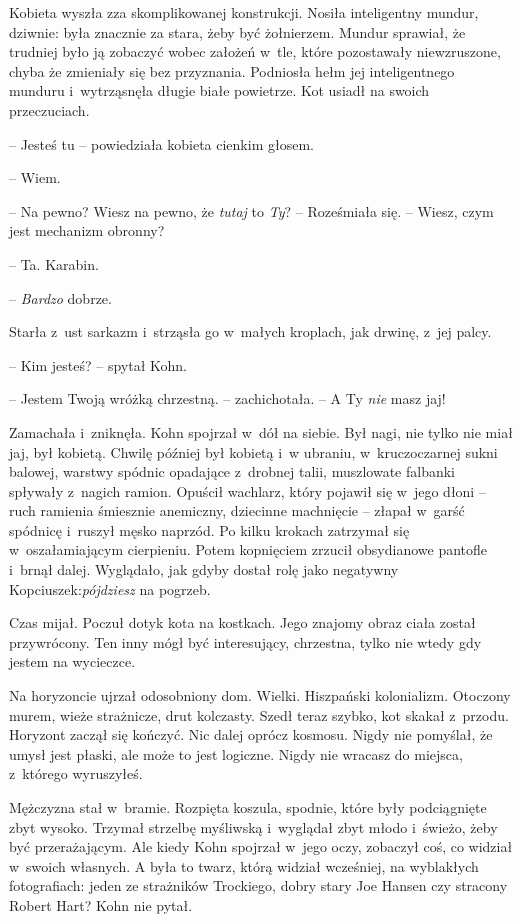 \documentclass[oneside,polish,11pt,sfheadings]{mwbk}
\begin{document}
Kobieta wyszła zza skomplikowanej konstrukcji. Nosiła inteligentny
mundur, dziwnie: była znacznie za stara, żeby być żołnierzem. Mundur
sprawiał, że trudniej było ją zobaczyć wobec założeń w~tle, które
pozostawały niewzruszone, chyba że zmieniały się bez przyznania.
Podniosła hełm jej inteligentnego munduru i~wytrząsnęła długie białe
powietrze. Kot usiadł na swoich przeczuciach.

-- Jesteś tu -- powiedziała kobieta cienkim głosem.

-- Wiem.

-- Na pewno? Wiesz na pewno, że \emph{tutaj} to \emph{Ty}? -- Roześmiała
się. -- Wiesz, czym jest mechanizm obronny?

-- Ta. Karabin.

-- \emph{Bardzo} dobrze.

Starła z~ust sarkazm i~strząsła go w~małych kroplach, jak drwinę, z~jej
palcy.

-- Kim jesteś? -- spytał Kohn.

-- Jestem Twoją wróżką chrzestną. -- zachichotała. -- A Ty \emph{nie} masz
jaj!

Zamachała i~zniknęła. Kohn spojrzał w~dół na siebie. Był nagi, nie tylko
nie miał jaj, był kobietą. Chwilę później był kobietą i~w ubraniu, w~kruczoczarnej sukni balowej, warstwy spódnic opadające z~drobnej talii,
muszlowate falbanki spływały z~nagich ramion. Opuścił wachlarz, który
pojawił się w~jego dłoni -- ruch ramienia śmiesznie anemiczny, dziecinne
machnięcie -- złapał w~garść spódnicę i~ruszył męsko naprzód. Po kilku
krokach zatrzymał się w~oszałamiającym cierpieniu. Potem kopnięciem
zrzucił obsydianowe pantofle i~brnął dalej. Wyglądało, jak gdyby dostał
rolę jako negatywny Kopciuszek:\emph{pójdziesz} na pogrzeb.

Czas mijał. Poczuł dotyk kota na kostkach. Jego znajomy obraz ciała
został przywrócony. Ten inny mógł być interesujący, chrzestna, tylko nie
wtedy gdy jestem na wycieczce.

Na horyzoncie ujrzał odosobniony dom. Wielki. Hiszpański kolonializm.
Otoczony murem, wieże strażnicze, drut kolczasty. Szedł teraz szybko,
kot skakał z~przodu. Horyzont zaczął się kończyć. Nic dalej oprócz
kosmosu. Nigdy nie pomyślał, że umysł jest płaski, ale może to jest
logiczne. Nigdy nie wracasz do miejsca, z~którego wyruszyłeś.

Mężczyzna stał w~bramie. Rozpięta koszula, spodnie, które były
podciągnięte zbyt wysoko. Trzymał strzelbę myśliwską i~wyglądał zbyt
młodo i~świeżo, żeby być przerażającym. Ale kiedy Kohn spojrzał w~jego
oczy, zobaczył coś, co widział w~swoich własnych. A była to twarz, którą
widział wcześniej, na wyblakłych fotografiach: jeden ze strażników
Trockiego, dobry stary Joe Hansen czy stracony Robert Hart? Kohn nie
pytał.
\end{document}

